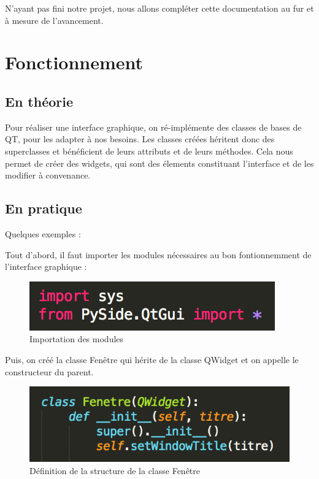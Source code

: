 \documentclass[a4paper,12pt]{article}
\begin{document}
N'ayant pas fini notre projet, nous allons compléter cette documentation au fur et à mesure de l'avancement.

\section{Fonctionnement}

	\subsection{En théorie}

		Pour réaliser une interface graphique, on ré-implémente des classes de bases de QT, pour les adapter à nos besoins. Les classes créées héritent donc des superclasses et bénéficient de leurs attributs et de leurs méthodes. Cela nous permet de créer des widgets, qui sont des élements constituant l'interface et de les modifier à convenance.

	\subsection{En pratique} 

		Quelques exemples :

		Tout d'abord, il faut importer les modules nécessaires au bon fontionnemment de l'interface graphique :

		\begin{figure}[!h]

			\begin{center}

				\includegraphics[scale=1]{"images/Import"}

				\caption{Importation des modules}

			\end{center}

		\end{figure}

		Puis, on créé la classe Fenêtre qui hérite de la classe QWidget et on appelle le constructeur du parent.

		\begin{figure}[!h]

			\begin{center}

				\includegraphics[scale=0.8]{"images/QWidget"}

				\caption{Définition de la structure de la classe Fenêtre}
			\end{center}

		\end{figure}
		
\end{document}
